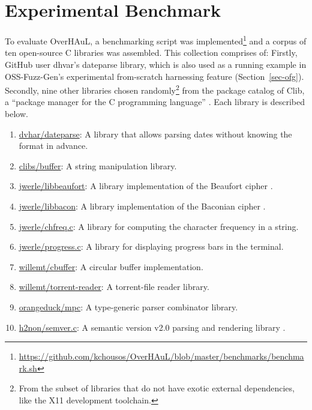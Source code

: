 \documentclass[
  a4paper,
  DIV=11,
  numbers=noendperiod]{scrreprt}
\providecommand{\tightlist}{%
  \setlength{\itemsep}{0pt}\setlength{\parskip}{0pt}}
\theoremstyle{definition}
\theoremstyle{remark}
\begin{document}
\section{Experimental Benchmark}\label{sec-benchmark}

To evaluate OverHAuL, a benchmarking script was implemented\footnote{\url{https://github.com/kchousos/OverHAuL/blob/master/benchmarks/benchmark.sh}}
and a corpus of ten open-source C libraries was assembled. This
collection comprises of: Firstly, GitHub user dhvar's dateparse library,
which is also used as a running example in OSS-Fuzz-Gen's
\autocite{oss-fuzz-gen} experimental from-scratch harnessing feature
(Section~\ref{sec-ofg}). Secondly, nine other libraries chosen
randomly\footnote{From the subset of libraries that do not have exotic
  external dependencies, like the X11 development toolchain.} from the
package catalog of Clib, a ``package manager for the C programming
language'' \autocite{clibs,clib}. Each library is described below.

\begin{enumerate}
\def\labelenumi{\arabic{enumi}.}
\tightlist
\item
  \href{https://github.com/dvhar/dateparse}{dvhar/dateparse}: A library
  that allows parsing dates without knowing the format in advance.
\item
  \href{https://github.com/clibs/buffer}{clibs/buffer}: A string
  manipulation library.
\item
  \href{https://github.com/jwerle/libbeaufort}{jwerle/libbeaufort}: A
  library implementation of the Beaufort cipher \autocite{franksen1993}.
\item
  \href{https://github.com/jwerle/libbacon}{jwerle/libbacon}: A library
  implementation of the Baconian cipher \autocite{bacon1861}.
\item
  \href{https://github.com/jwerle/chfreq.c}{jwerle/chfreq.c}: A library
  for computing the character frequency in a string.
\item
  \href{https://github.com/jwerle/progress.c}{jwerle/progress.c}: A
  library for displaying progress bars in the terminal.
\item
  \href{https://github.com/willemt/cbuffer}{willemt/cbuffer}: A circular
  buffer implementation.
\item
  \href{https://github.com/willemt/torrent-reader}{willemt/torrent-reader}:
  A torrent-file reader library.
\item
  \href{https://github.com/orangeduck/mpc}{orangeduck/mpc}: A
  type-generic parser combinator library.
\item
  \href{https://github.com/h2non/semver.c}{h2non/semver.c}: A semantic
  version v2.0 parsing and rendering library \autocite{semver}.
\end{enumerate}
\end{document}
